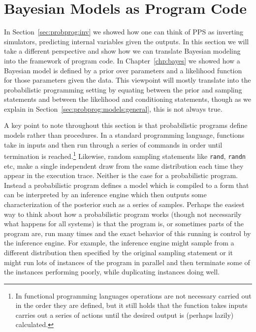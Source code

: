 
\section{Bayesian Models as Program Code}
\label{sec:probprog:models}

In Section~\ref{sec:probprog:inv} we showed how one can think of PPS as inverting simulators, 
predicting internal variables given the outputs.  In this section we will take a 
different perspective and
show how we can translate Bayesian modeling into the framework of program code.   
In Chapter~\ref{chp:bayes} we showed how a Bayesian model is defined by a prior over
parameters and a likelihood function for those parameters given the data.  This viewpoint will
mostly translate into the probabilistic programming setting by equating between the prior
and sampling statements and between the likelihood and conditioning statements, though as
we explain in Section~\ref{sec:probprog:models:general}, this is not always true.

A key point to note throughout this section is that probabilistic programs define
models rather than procedures.  In a standard programming language, functions take in inputs
and then run through a series of commands in order until termination is reached.\footnote{In functional
	programming languages operations are not necessary carried out in the order they are defined,
	but it still holds that the function takes inputs carries out a series of actions until the desired output
	is (perhaps lazily) calculated.}  Likewise, random sampling statements like \texttt{rand}, \texttt{randn}
etc, make a single independent draw from the same distribution each time they appear in the execution trace.
Neither is the case for a probabilistic program.  Instead a probabilistic program defines a model
which is compiled to a form that can be interpreted by an inference engine which then
outputs some characterization of the posterior such as a series of samples.  Perhaps the easiest way to think
about how a probabilistic program works (though not necessarily what happens for all systems) is that
the program is, or sometimes parts of the program are, run many times and the exact behavior
of this running is control by the inference engine.  For example, the inference engine 
might sample from a different distribution then specified by the original sampling statement or it
might run lots of instances of the program in parallel and then terminate some of the instances
performing poorly, while duplicating instances doing well.

